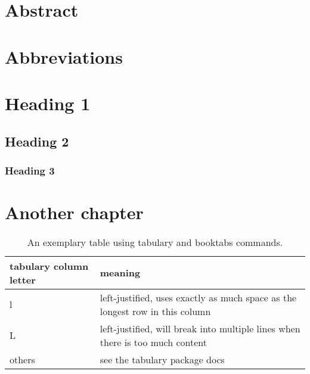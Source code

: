 \documentclass[headsepline,titlepage,twoside,12pt,toc=flat,headings=normal]{scrreprt}
\author{\theauthor}
\date{\thedate}
\title{\thetitle}
\subtitle{Subtitle (optional)}
\begin{document}
\maketitle
\imprint

\chapter*{Abstract}\label{ch:abstract}

\chapter*{Abbreviations}%

\begin{acronym}
\end{acronym}

\tableofcontents
{}

\chapter{Heading 1}\label{ch:firstchapter}
\section{Heading 2}
\subsection{Heading 3}
\lipsum[1-5]%

\chapter{Another chapter}\label{ch:anotherchapter}

\begin{table}[ht]
\begin{tabulary}{\textwidth}{lL}
\toprule
tabulary column letter	&meaning\\
\midrule
l						&left-justified, uses exactly as much space as the longest row in this column \\
L						&left-justified, will break into multiple lines when there is too much content\\
others					&see the tabulary package docs\\
\bottomrule
\end{tabulary}
\caption{An exemplary table using tabulary and booktabs commands.}
\label{tab:example}
\end{table}
\end{document}
